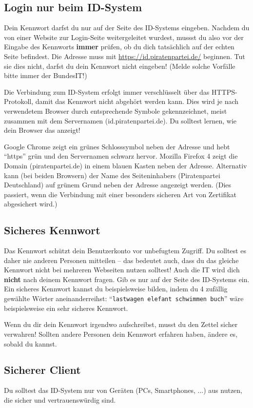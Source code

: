 \subsection{Login nur beim ID-System}
Dein Kennwort darfst du nur auf der Seite des ID-Systems eingeben.
Nachdem du von einer Website zur Login-Seite weitergeleitet wurdest, mussst du also vor der Eingabe des Kennworts \textbf{immer} prüfen,
ob du dich tatsächlich auf der echten Seite befindest.
Die Adresse muss mit \url{https://id.piratenpartei.de/} beginnen. Tut sie dies nicht, darfst du dein Kennwort nicht eingeben!
(Melde solche Vorfälle bitte immer der BundesIT!)

Die Verbindung zum ID-System erfolgt immer verschlüsselt über das HTTPS-Protokoll, damit das Kennwort nicht abgehört werden kann.
Dies wird je nach verwendetem Browser durch entsprechende Symbole gekennzeichnet, meist zusammen mit dem Servernamen (id.piratenpartei.de).
Du solltest lernen, wie dein Browser das anzeigt!

Google Chrome zeigt ein grünes Schlosssymbol neben der Adresse und hebt "`https"' grün und den Servernamen schwarz hervor.
Mozilla Firefox 4 zeigt die Domain (piratenpartei.de) in einem blauen Kasten neben der Adresse.
Alternativ kann (bei beiden Browsern) der Name des Seiteninhabers (Piratenpartei Deutschland) auf grünem Grund neben der Adresse angezeigt werden.
(Dies passiert, wenn die Verbindung mit einer besonders sicheren Art von Zertifikat abgesichert wird.)

\subsection{Sicheres Kennwort}
Das Kennwort schützt dein Benutzerkonto vor unbefugtem Zugriff.
Du solltest es daher nie anderen Personen mitteilen -- das bedeutet auch, dass du das gleiche Kennwort nicht bei mehreren Webseiten nutzen solltest!
Auch die IT wird dich \textbf{nicht} nach deinem Kennwort fragen. Gib es nur auf der Seite des ID-Systems ein.
Ein sicheres Kennwort kannst du beispielsweise bilden, indem du 4 zufällig gewählte Wörter aneinanderreihst:
"`\texttt{lastwagen elefant schwimmen buch}"' wäre beispielsweise ein sehr sicheres Kennwort.

Wenn du dir dein Kennwort irgendwo aufschreibst, musst du den Zettel sicher verwahren!
Sollten andere Personen dein Kennwort erfahren haben, ändere es, sobald du kannst.

\subsection{Sicherer Client}
Du solltest das ID-System nur von Geräten (PCs, Smartphones, ...) aus nutzen, die sicher und vertrauenswürdig sind.

